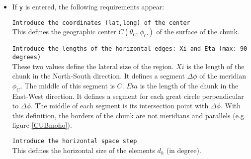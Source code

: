 \begin{itemize}[topsep=2pt,itemsep=4pt]

\item If \texttt{y} is entered, the following requirements appear:
\parskip 10pt

\texttt{Introduce the coordinates (lat,long) of the center}\\
This defines the geographic center $C(\theta_C,\phi_C )$ of the surface of the chunk.

\texttt{Introduce the lengths of the horizontal edges: Xi and Eta \linebreak
(max: 90 degrees)}\\
These two values define the lateral size of the region. $Xi$ is the length of the chunk in the North-South direction. It defines a segment $\Delta \phi$ of the meridian $\phi_C$. The middle of this segment is $C$. $Eta$ is the length of the chunk in the East-West direction. It defines a segment for each great circle perpendicular to $\Delta \phi$. The middle of each segment is its intersection point with $\Delta \phi$. With this definition, the borders of the chunk are not meridians and parallels (e.g. figure \ref{CUBmoho}).

\texttt{Introduce the horizontal space step}\\
This defines the horizontal size of the elements $d_h$ (in degree).


\end{itemize}
